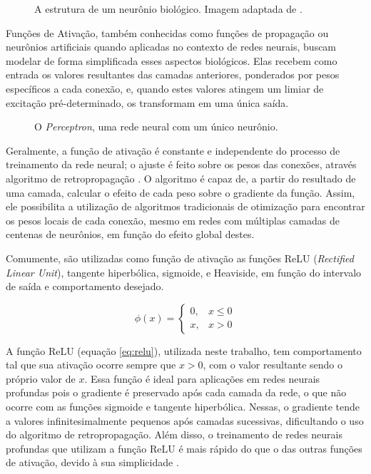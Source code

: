 \begin{figure}[H]
    \centering
    
    \caption{A estrutura de um neurônio biológico. Imagem adaptada de \cite{dhp1080IdoSkemoPri2016}.}
    \label{fig:bio_neuron}
\end{figure}

Funções de Ativação, também conhecidas como funções de propagação ou neurônios artificiais quando aplicadas no contexto de redes neurais, buscam modelar de forma simplificada esses aspectos biológicos.
Elas recebem como entrada os valores resultantes das camadas anteriores, ponderados por pesos específicos a cada conexão, e, quando estes valores atingem um limiar de excitação pré-determinado, os transformam em uma única saída.

\begin{figure}[H]
    \centering
    
    \caption{O \textit{Perceptron}, uma rede neural com um único neurônio.}
    \label{fig:perceptron}
\end{figure}

Geralmente, a função de ativação é constante e independente do processo de treinamento da rede neural; o ajuste é feito sobre os pesos das conexões, através algoritmo de retropropagação \cite{dreyfusArtificialNeuralNetworks1990}.
O algoritmo é capaz de, a partir do resultado de uma camada, calcular o efeito de cada peso sobre o gradiente da função.
Assim, ele possibilita a utilização de algoritmos tradicionais de otimização para encontrar os pesos locais de cada conexão, mesmo em redes com múltiplas camadas de centenas de neurônios, em função do efeito global destes.

Comumente, são utilizadas como função de ativação as funções ReLU (\textit{Rectified Linear Unit}), tangente hiperbólica, sigmoide, e Heaviside, em função do intervalo de saída e comportamento desejado.

\begin{equation}\label{eq:relu}
    \phi(x) = \left\{
        \begin{array}{ll}
            0, & x \le 0\\
            x, & x > 0
        \end{array}
    \right.
\end{equation}

A função ReLU (equação \ref{eq:relu}), utilizada neste trabalho, tem comportamento tal que sua ativação ocorre sempre que $x>0$, com o valor resultante sendo o próprio valor de $x$. 
Essa função é ideal para aplicações em redes neurais profundas pois o gradiente é preservado após cada camada da rede, o que não ocorre com as funções sigmoide e tangente hiperbólica.
Nessas, o gradiente tende a valores infinitesimalmente pequenos após camadas sucessivas, dificultando o uso do algoritmo de retropropagação.
Além disso, o treinamento de redes neurais profundas que utilizam a função ReLU é mais rápido do que o das outras funções de ativação, devido à sua simplicidade \cite{krizhevskyImageNetClassificationDeep2017}.

